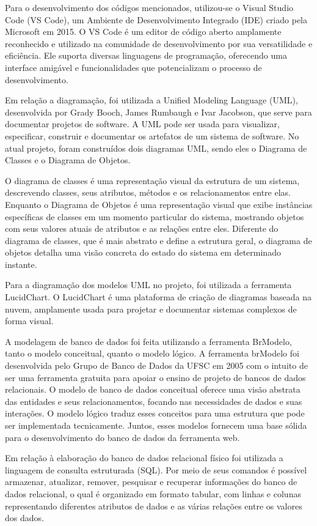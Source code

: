 Para o desenvolvimento dos códigos mencionados, utilizou-se o Visual Studio Code (VS Code), um Ambiente de Desenvolvimento Integrado (IDE) criado pela Microsoft em 2015. O VS Code é um editor de código aberto amplamente reconhecido e utilizado na comunidade de desenvolvimento por sua versatilidade e eficiência. Ele suporta diversas linguagens de programação, oferecendo uma interface amigável e funcionalidades que potencializam o processo de desenvolvimento. \textcite{Akira}

Em relação a diagramação, foi utilizada a Unified Modeling Language (UML), desenvolvida por Grady Booch, James Rumbaugh e Ivar Jacobson, que serve para documentar projetos de software. A UML pode ser usada para visualizar, especificar, construir e documentar os artefatos de um sistema de software. No atual projeto, foram construídos dois diagramas UML, sendo eles o Diagrama de Classes e o Diagrama de Objetos.

O diagrama de classes é uma representação visual da estrutura de um sistema, descrevendo classes, seus atributos, métodos e os relacionamentos entre elas. Enquanto o Diagrama de Objetos é uma representação visual que exibe instâncias específicas de classes em um momento particular do sistema, mostrando objetos com seus valores atuais de atributos e as relações entre eles. Diferente do diagrama de classes, que é mais abstrato e define a estrutura geral, o diagrama de objetos detalha uma visão concreta do estado do sistema em determinado instante.

Para a diagramação dos modelos UML no projeto, foi utilizada a ferramenta LucidChart. O LucidChart é uma plataforma de criação de diagramas baseada na nuvem, amplamente usada para projetar e documentar sistemas complexos de forma visual.

A modelagem de banco de dados foi feita utilizando a ferramenta BrModelo, tanto o modelo conceitual, quanto o modelo lógico. A ferramenta brModelo foi desenvolvida pelo Grupo de Banco de Dados da UFSC em 2005 com o intuito de ser uma ferramenta gratuita para apoiar o ensino de projeto de bancos de dados relacionais. O modelo de banco de dados conceitual oferece uma visão abstrata das entidades e seus relacionamentos, focando nas necessidades de dados e suas interações. O modelo lógico traduz esses conceitos para uma estrutura que pode ser implementada tecnicamente. Juntos, esses modelos fornecem uma base sólida para o desenvolvimento do banco de dados da ferramenta web. \textcite{SBBD}

Em relação à elaboração do banco de dados relacional físico foi utilizada a linguagem de consulta estruturada (SQL). Por meio de seus comandos é possível armazenar, atualizar, remover, pesquisar e recuperar informações do banco de dados relacional, o qual é organizado em formato tabular, com linhas e colunas representando diferentes atributos de dados e as várias relações entre os valores dos dados. \textcite{Amazon}

